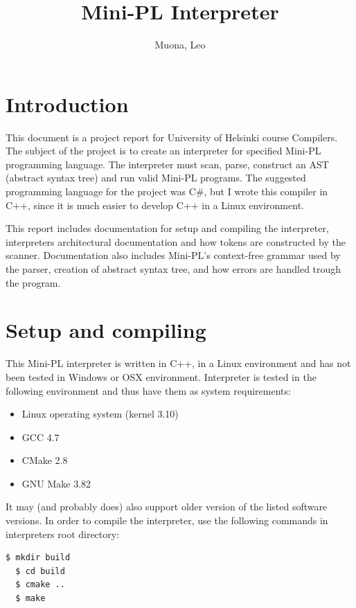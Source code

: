 \documentclass[english,11pt,twoside,a4paper]{article}
\newcommand{\subtitle}[1]{%
  \posttitle{%
    \par\end{center}
    \begin{center}\large#1\end{center}
    \vskip0.5em}%
}
\begin{document}
\author{
  Muona, Leo
}
\title{Mini-PL Interpreter}
\subtitle{Compilers - Project report}

\maketitle

\tableofcontents

\section{Introduction}

This document is a project report for University of Helsinki course Compilers. The subject of the project is to create an interpreter for specified Mini-PL programming language. The interpreter must scan, parse, construct an AST (abstract syntax tree) and run valid Mini-PL programs. The suggested programming language for the project was C\#, but I wrote this compiler in C++, since it is much easier to develop C++ in a Linux environment.

This report includes documentation for setup and compiling the interpreter, interpreters architectural documentation and how tokens are constructed by the scanner. Documentation also includes Mini-PL's context-free grammar used by the parser, creation of abstract syntax tree, and how errors are handled trough the program.

\section{Setup and compiling}

This Mini-PL interpreter is written in C++, in a Linux environment and has not been tested in Windows or OSX environment. Interpreter is tested in the following environment and thus have them as system requirements:

\begin{itemize}
	\item Linux operating system (kernel 3.10)
	\item GCC 4.7
	\item CMake 2.8
	\item GNU Make 3.82
\end{itemize}

It may (and probably does) also support older version of the listed software versions. In order to compile the interpreter, use the following commands in interpreters root directory:

\begin{lstlisting}[language=bash]
  $ mkdir build
  $ cd build
  $ cmake ..
  $ make
\end{lstlisting}
\end{document}

